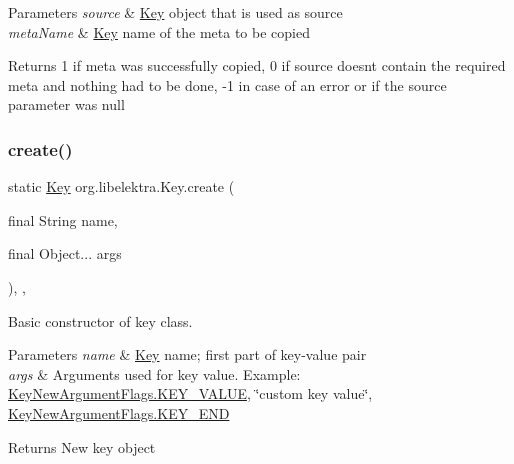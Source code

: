 \begin{DoxyParams}{Parameters}
{\em source} & \hyperlink{classorg_1_1libelektra_1_1Key}{Key} object that is used as source \\
\hline
{\em meta\+Name} & \hyperlink{classorg_1_1libelektra_1_1Key}{Key} name of the meta to be copied \\
\hline
\end{DoxyParams}
\begin{DoxyReturn}{Returns}
1 if meta was successfully copied, 0 if source doesn\textquotesingle{}t contain the required meta and nothing had to be done, -\/1 in case of an error or if the source parameter was null 
\end{DoxyReturn}
\mbox{\label{classorg_1_1libelektra_1_1Key_af407cf43625618af4e7fb2576037fcfc}} 
\subsubsection{\texorpdfstring{create()}{create()}\hspace{0.1cm}{\footnotesize\ttfamily [1/3]}}
{\footnotesize\ttfamily static \hyperlink{classorg_1_1libelektra_1_1Key}{Key} org.\+libelektra.\+Key.\+create (\begin{DoxyParamCaption}\item[{final String}]{name,  }\item[{final Object...}]{args }\end{DoxyParamCaption})\hspace{0.3cm}{\ttfamily [inline]}, {\ttfamily [static]}, {\ttfamily [protected]}}



Basic constructor of key class. 


\begin{DoxyParams}{Parameters}
{\em name} & \hyperlink{classorg_1_1libelektra_1_1Key}{Key} name; first part of key-\/value pair \\
\hline
{\em args} & Arguments used for key value. Example\+:~\newline
 \hyperlink{enumorg_1_1libelektra_1_1Elektra_1_1KeyNewArgumentFlags_af2a71635dab3ce6d301d102e4bf8fef2}{Key\+New\+Argument\+Flags.\+K\+E\+Y\+\_\+\+V\+A\+L\+UE}, \char`\"{}custom key value\char`\"{}, \hyperlink{enumorg_1_1libelektra_1_1Elektra_1_1KeyNewArgumentFlags_a284d90f457be9489b0a52eb55f0977ab}{Key\+New\+Argument\+Flags.\+K\+E\+Y\+\_\+\+E\+ND} \\
\hline
\end{DoxyParams}
\begin{DoxyReturn}{Returns}
New key object 
\end{DoxyReturn}
\mbox{\label{classorg_1_1libelektra_1_1Key_a785f6b8e937d51575a4acc2ebc8f19a2}} 

